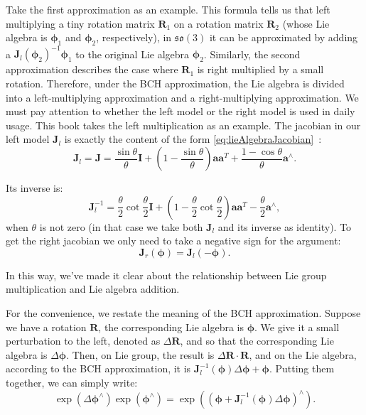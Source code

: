 Take the first approximation as an example. This formula tells us that left multiplying a tiny rotation matrix $\mathbf{R}_1$ on a rotation matrix $\mathbf{R}_2$ (whose Lie algebra is $\boldsymbol{\phi}_1$ and $\boldsymbol{\phi}_2$, respectively), in $\mathfrak{so}(3)$ it can be approximated by adding a $\mathbf{J}_l \left( {\boldsymbol{\phi} _2} \right)^{ - 1} { \boldsymbol{\phi} _1}$ to the original Lie algebra $\boldsymbol{\phi}_2$.  Similarly, the second approximation describes the case where $\mathbf{R}_1$ is right multiplied by a small rotation. Therefore, under the BCH approximation, the Lie algebra is divided into a left-multiplying approximation and a right-multiplying approximation. We must pay attention to whether the left model or the right model is used in daily usage. This book takes the left multiplication as an example. The jacobian in our left model $\mathbf{J}_l$ is exactly the content of the form \eqref{eq:lieAlgebraJacobian}~:
\begin{equation}
{ \mathbf{J}_l} = \mathbf{J} = \frac{{\sin \theta }}{\theta } \mathbf{I} + \left( {1 - \frac{{\sin \theta } }{\theta }} \right) \mathbf{a} { \mathbf{a}^T} + \frac{{1 - \cos \theta }}{\theta }{ \mathbf{a} ^ \wedge}.
\end{equation}

Its inverse is:
\begin{equation}
\mathbf{J}_l^{ - 1} = \frac{\theta }{2}\cot \frac{\theta }{2} \mathbf{I} + \left( {1 - \frac{\theta } {2}\cot \frac{\theta }{2}} \right) \mathbf{a} {\mathbf{a}^T} - \frac{\theta }{2}{ \mathbf{ a}^ \wedge },
\end{equation}
when $\theta$ is not zero (in that case we take both $\mathbf{J}_{l}$ and its inverse as identity). To get the right jacobian we only need to take a negative sign for the argument:
\begin{equation}
\mathbf{J}_r(\boldsymbol{\phi}) =\mathbf{J}_l(-\boldsymbol{\phi}) .
\end{equation}

In this way, we've made it clear about the relationship between Lie group multiplication and Lie algebra addition.

For the convenience, we restate the meaning of the BCH approximation. Suppose we have a rotation $\mathbf{R}$, the corresponding Lie algebra is $\boldsymbol{\phi}$. We give it a small perturbation to the left, denoted as $\Delta \mathbf{R}$, and so that the corresponding Lie algebra is $\Delta \boldsymbol{\phi}$. Then, on Lie group, the result is $ \Delta \mathbf{R} \cdot \mathbf{R}$, and on the Lie algebra, according to the BCH approximation, it is $\mathbf{J}_l^{-1 } (\boldsymbol{\phi}) \Delta \boldsymbol{\phi} + \boldsymbol{\phi}$. Putting them together, we can simply write:
\begin{equation}
\exp \left( {\Delta { \boldsymbol{\phi} ^ \wedge }} \right)\exp \left( {{ \boldsymbol{\phi} ^ \wedge }} \right) = \exp \left( {{{\left( { \boldsymbol{\phi} + \mathbf{J}_l^{ - 1}\left( \boldsymbol{\phi} \right)\Delta \boldsymbol{\phi} } \right)} ^ \wedge }} \right).
\end{equation}

